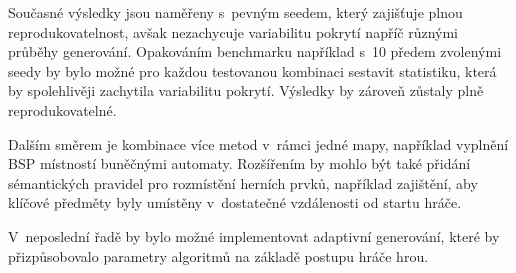 \documentclass[
   program=itk,
   biblatex,
   figures=true,
   tables=true,
   glossaries,
   index
]{kidiplom}
\begin{document}
Současné výsledky jsou naměřeny s~pevným seedem, který zajišťuje plnou reprodukovatelnost, avšak nezachycuje variabilitu pokrytí napříč různými průběhy generování. Opakováním benchmarku například s~10 předem zvolenými seedy by bylo možné pro každou testovanou kombinaci sestavit statistiku, která by spolehlivěji zachytila variabilitu pokrytí. Výsledky by zároveň zůstaly plně reprodukovatelné.

Dalším směrem je kombinace více metod v~rámci jedné mapy, například vyplnění BSP místností buněčnými automaty. Rozšířením by mohlo být také přidání sémantických pravidel pro rozmístění herních prvků, například zajištění, aby klíčové předměty byly umístěny v~dostatečné vzdálenosti od startu hráče.

V~neposlední řadě by bylo možné implementovat adaptivní generování, které by přizpůsobovalo parametry algoritmů na základě postupu hráče hrou.
\end{document}
